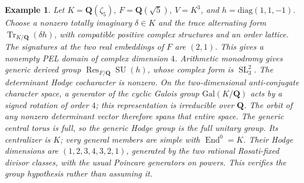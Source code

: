 \documentclass[11pt,reqno]{article}
\theoremstyle{emphasizedplain}
\theoremstyle{emphasizeddefinition}
\newtheorem{example}[theorem]{Example}
\theoremstyle{emphasizeddefinition}
\DeclareMathOperator{\End}{End}
\DeclareMathOperator{\SL}{SL}
\DeclareMathOperator{\SU}{SU}
\DeclareMathOperator{\Res}{Res}
\DeclareMathOperator{\Tr}{Tr}
\newcommand{\Q}{\mathbf Q}
\begin{document}
\begin{example}
Let $K=\Q(\zeta_5)$, $F=\Q(\sqrt5)$, $V=K^3$, and
$h=\mathrm{diag}(1,1,-1)$. Choose a nonzero totally imaginary
$\delta\in K$ and the trace alternating form $\Tr_{K/\Q}(\delta h)$,
with compatible positive complex structures and an order lattice.
The signatures at the two real embeddings of $F$ are $(2,1)$.
This gives a nonempty PEL domain of complex dimension $4$.
Arithmetic monodromy gives generic derived group
$\Res_{F/\Q}\SU(h)$, whose complex form is $\SL_3^2$.
The determinant Hodge cocharacter is nonzero. On the two-dimensional
anti-conjugate character space, a generator of the cyclic Galois group
$\mathrm{Gal}(K/\Q)$ acts by a signed rotation of order $4$; this
representation is irreducible over $\Q$. The orbit of any nonzero
determinant vector therefore spans that entire space. The generic
central torus is full, so the generic Hodge group is the full unitary group.
Its centralizer is $K$; very general members are simple with $\End^0=K$.
Their Hodge dimensions are $(1,2,3,4,3,2,1)$, generated by the two
rational Rosati-fixed divisor classes, with the usual Poincare generators
on powers. This verifies the group hypothesis rather than assuming it.
\end{example}
\end{document}
